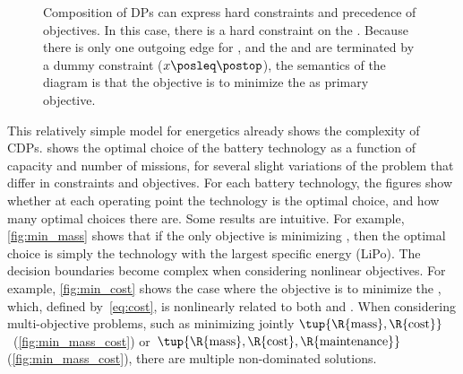 \begin{figure}
    \begin{centering}
    \end{centering}
    \begin{centering}
    \end{centering}
    \smallskip{}

    \caption{
        Composition of DPs can express hard constraints and precedence of objectives.
        In this case, there is a hard constraint on the .
        Because there is only one outgoing edge for , and the  and  are terminated by a dummy constraint ($x\posleq\postop$), the semantics of the diagram is that the objective is to minimize the  as primary objective.
    }
\end{figure}

This relatively simple model for energetics already shows the complexity of CDPs.
 shows the optimal choice of the battery technology as a function of capacity and number of missions, for several slight variations of the problem that differ in constraints and objectives.
For each battery technology, the figures show whether at each operating point the technology is the optimal choice, and how many optimal choices there are.
Some results are intuitive.
For example, \cref{fig:min_mass} shows that if the only objective is minimizing , then the optimal choice is simply the technology with the largest specific energy (LiPo).
The decision boundaries become complex when considering nonlinear objectives.
For example, \cref{fig:min_cost} shows the case where the objective is to minimize the , which, defined by~\cref{eq:cost}, is nonlinearly related to both  and .
When considering multi-objective problems, such as minimizing jointly $\tup{ \R{\text{mass}},\R{\text{cost}}} $~(\cref{fig:min_mass_cost}) or~$\tup{ \R{\text{mass}},\R{\text{cost}},\R{\text{maintenance}}} $ (\cref{fig:min_mass_cost}), there are multiple non-dominated solutions.

